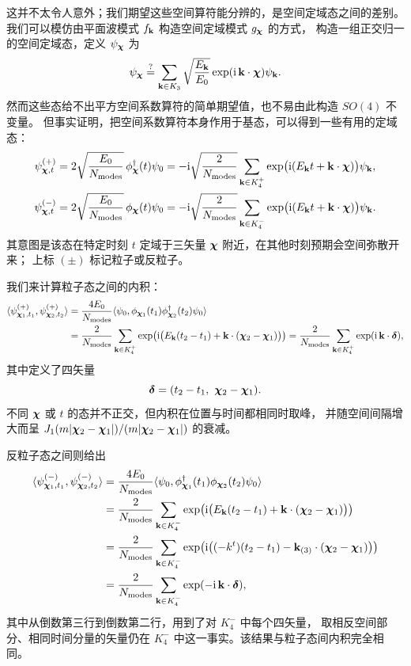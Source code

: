 这并不太令人意外；我们期望这些空间算符能分辨的，是空间定域态之间的差别。
我们可以模仿由平面波模式 $f_{\mathbf{k}}$ 构造空间定域模式 $g_{\boldsymbol{\chi}}$ 的方式，
构造一组正交归一的空间定域态，定义 $\psi_{\boldsymbol{\chi}}$ 为
\begin{equation*}
\psi_{\boldsymbol{\chi}}\overset{?}{=}\sum_{\mathbf{k}\in K_{3}}\sqrt{\frac{E_{\mathbf{k}}}{E_{0}}}\exp(\mathrm{i}\,\mathbf{k}\cdot\boldsymbol{\chi})\psi_{\mathbf{k}}.
\end{equation*}
然而这些态给不出平方空间系数算符的简单期望值，也不易由此构造 $SO(4)$ 不变量。
但事实证明，把空间系数算符本身作用于基态，可以得到一些有用的定域态：
\begin{align*}
\psi^{(+)}_{\boldsymbol{\chi},t}&=2\sqrt{\frac{E_{0}}{N_{\text{modes}}}}\,\phi^{\dagger}_{\boldsymbol{\chi}}(t)\psi_{0}
=-\mathrm{i}\sqrt{\frac{2}{N_{\text{modes}}}}\sum_{\mathbf{k}\in K_{4}^{+}}
\exp\bigl(\mathrm{i}(E_{\mathbf{k}}t+\mathbf{k}\cdot\boldsymbol{\chi})\bigr)\psi_{\mathbf{k}},\\
\psi^{(-)}_{\boldsymbol{\chi},t}&=2\sqrt{\frac{E_{0}}{N_{\text{modes}}}}\,\phi_{\boldsymbol{\chi}}(t)\psi_{0}
=-\mathrm{i}\sqrt{\frac{2}{N_{\text{modes}}}}\sum_{\mathbf{k}\in K_{4}^{-}}
\exp\bigl(\mathrm{i}(E_{\mathbf{k}}t+\mathbf{k}\cdot\boldsymbol{\chi})\bigr)\psi_{\mathbf{k}}.
\end{align*}
其意图是该态在特定时刻 $t$ 定域于三矢量 $\boldsymbol{\chi}$ 附近，在其他时刻预期会空间弥散开来；
上标 $(\pm)$ 标记粒子或反粒子。

我们来计算粒子态之间的内积：
\begin{align*}
\langle\psi^{(+)}_{\boldsymbol{\chi}_{1},t_{1}},\psi^{(+)}_{\boldsymbol{\chi}_{2},t_{2}}\rangle
&=\frac{4E_{0}}{N_{\text{modes}}}\langle\psi_{0},
\phi_{\boldsymbol{\chi}_{1}}(t_{1})\phi^{\dagger}_{\boldsymbol{\chi}_{2}}(t_{2})\psi_{0}\rangle\\
&=\frac{2}{N_{\text{modes}}}\sum_{\mathbf{k}\in K_{4}^{+}}
\exp\bigl(\mathrm{i}\bigl(E_{\mathbf{k}}(t_{2}-t_{1})+\mathbf{k}\cdot(\boldsymbol{\chi}_{2}-\boldsymbol{\chi}_{1})\bigr)\bigr)
=\frac{2}{N_{\text{modes}}}\sum_{\mathbf{k}\in K_{4}^{+}}\exp(\mathrm{i}\,\mathbf{k}\cdot\boldsymbol{\delta}),
\end{align*}
其中定义了四矢量
\begin{equation*}
\bdelta=(t_{2}-t_{1},\ \bchi_{2}-\bchi_{1}).
\end{equation*}
不同 $\boldsymbol{\chi}$ 或 $t$ 的态并不正交，但内积在位置与时间都相同时取峰，
并随空间间隔增大而呈 $J_{1}(m|\boldsymbol{\chi}_{2}-\boldsymbol{\chi}_{1}|)/(m|\boldsymbol{\chi}_{2}-\boldsymbol{\chi}_{1}|)$ 的衰减。

反粒子态之间则给出
\begin{align*}
\langle\psi^{(-)}_{\boldsymbol{\chi}_{1},t_{1}},\psi^{(-)}_{\boldsymbol{\chi}_{2},t_{2}}\rangle
&=\frac{4E_{0}}{N_{\text{modes}}}\langle\psi_{0},
\phi^{\dagger}_{\boldsymbol{\chi}_{1}}(t_{1})\phi_{\boldsymbol{\chi}_{2}}(t_{2})\psi_{0}\rangle\\
&=\frac{2}{N_{\text{modes}}}\sum_{\mathbf{k}\in K_{4}^{-}}
\exp\bigl(\mathrm{i}\bigl(E_{\mathbf{k}}(t_{2}-t_{1})+\mathbf{k}\cdot(\boldsymbol{\chi}_{2}-\boldsymbol{\chi}_{1})\bigr)\bigr)\\
&=\frac{2}{N_{\text{modes}}}\sum_{\mathbf{k}\in K_{4}^{-}}
\exp\bigl(\mathrm{i}\bigl((-k^{t})(t_{2}-t_{1})-\mathbf{k}_{(3)}\cdot(\boldsymbol{\chi}_{2}-\boldsymbol{\chi}_{1})\bigr)\bigr)\\
&=\frac{2}{N_{\text{modes}}}\sum_{\mathbf{k}\in K_{4}^{-}}\exp(-\mathrm{i}\,\mathbf{k}\cdot\boldsymbol{\delta}),
\end{align*}
其中从倒数第三行到倒数第二行，用到了对 $K_{4}^{-}$ 中每个四矢量，
取相反空间部分、相同时间分量的矢量仍在 $K_{4}^{-}$ 中这一事实。该结果与粒子态间内积完全相同。


